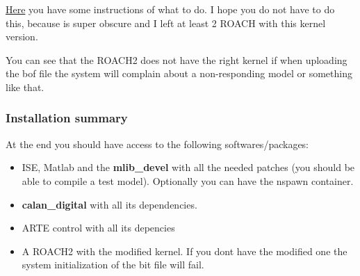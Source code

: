 \href{https://github.com/sebajor/simulink_models/tree/master/DRAM/ROACH2}{Here} you have some instructions of what to do. I hope you do not have to do this, because is super obscure and I left at least 2 ROACH with this kernel version.

You can see that the ROACH2 does not have the right kernel if when uploading the bof file the system will complain about a non-responding model or something like that.


\subsubsection{Installation summary}
At the end you should have access to the following softwares/packages:
\begin{itemize}
    \item ISE, Matlab and the \textbf{mlib\_devel} with all the needed patches (you should be able to compile a test model). Optionally you can have the nspawn container.
    \item \textbf{calan\_digital} with all its dependencies.
    \item ARTE control with all its depencies
    \item A ROACH2 with the modified kernel. If you dont have the modified one the system initialization of the bit file will fail.
\end{itemize}



